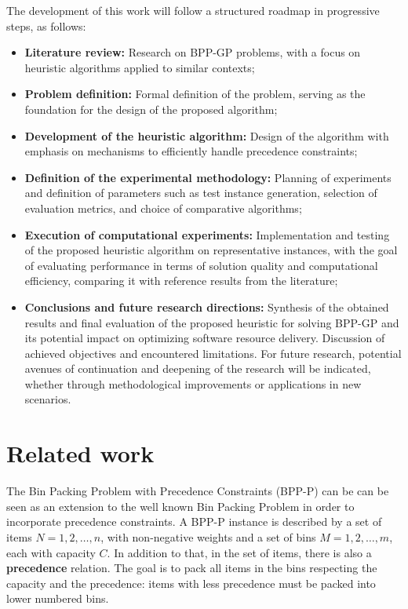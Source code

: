 \documentclass[12pt]{article}
\begin{document}
The development of this work will follow a structured roadmap in progressive steps, as follows:
\begin{itemize}
    \item \textbf{Literature review:} Research on BPP-GP problems, with a focus on heuristic algorithms applied to similar contexts;
    \item \textbf{Problem definition:} Formal definition of the problem, serving as the foundation for the design of the proposed algorithm;
    \item \textbf{Development of the heuristic algorithm:} Design of the algorithm with emphasis on mechanisms to efficiently handle precedence constraints;
    \item \textbf{Definition of the experimental methodology:} Planning of experiments and definition of parameters such as test instance generation, selection of evaluation metrics, and choice of comparative algorithms;
    \item \textbf{Execution of computational experiments:} Implementation and testing of the proposed heuristic algorithm on representative instances, with the goal of evaluating performance in terms of solution quality and computational efficiency, comparing it with reference results from the literature;
    \item \textbf{Conclusions and future research directions:} Synthesis of the obtained results and final evaluation of the proposed heuristic for solving BPP-GP and its potential impact on optimizing software resource delivery. Discussion of achieved objectives and encountered limitations. For future research, potential avenues of continuation and deepening of the research will be indicated, whether through methodological improvements or applications in new scenarios.
\end{itemize}

\section{Related work}

The Bin Packing Problem with Precedence Constraints (BPP-P) can be can be seen as an extension to the well known Bin Packing Problem in order to incorporate precedence constraints. A BPP-P instance is described by a set of items \(N = {1, 2, \dots, n}\), with non-negative weights and a set of bins \(M = {1, 2, \dots, m}\), each with capacity \(C\). In addition to that, in the set of items, there is also a \textbf{precedence} relation. The goal is to pack all items in the bins respecting the capacity and the precedence: items with less precedence must be packed into lower numbered bins.
\end{document}
